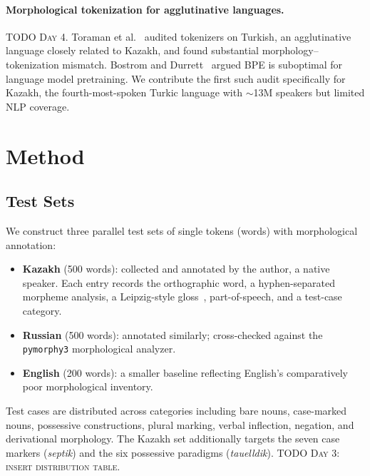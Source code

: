\documentclass{article}
\begin{document}
\paragraph{Morphological tokenization for agglutinative languages.}
\textsc{TODO Day 4.} Toraman et al.~\citep{toraman2023turkish} audited tokenizers
on Turkish, an agglutinative language closely related to Kazakh, and found
substantial morphology--tokenization mismatch. Bostrom and
Durrett~\citep{bostrom2020bpe} argued BPE is suboptimal for language model
pretraining. We contribute the first such audit specifically for Kazakh, the
fourth-most-spoken Turkic language with $\sim$13M speakers but limited NLP coverage.

\section{Method}
\label{sec:method}


\subsection{Test Sets}
\label{sec:testsets}
We construct three parallel test sets of single tokens (words) with morphological
annotation:
\begin{itemize}
  \item \textbf{Kazakh} (500 words): collected and annotated by the author,
        a native speaker. Each entry records the orthographic word, a hyphen-separated
        morpheme analysis, a Leipzig-style gloss~\citep{lehmann2004leipzig}, part-of-speech,
        and a test-case category.
  \item \textbf{Russian} (500 words): annotated similarly; cross-checked against the
        \texttt{pymorphy3} morphological analyzer.
  \item \textbf{English} (200 words): a smaller baseline reflecting English's
        comparatively poor morphological inventory.
\end{itemize}
Test cases are distributed across categories including bare nouns, case-marked nouns,
possessive constructions, plural marking, verbal inflection, negation, and derivational
morphology. The Kazakh set additionally targets the seven case markers (\emph{septik})
and the six possessive paradigms (\emph{tauelldik}). \textsc{TODO Day 3: insert
distribution table.}
\end{document}

